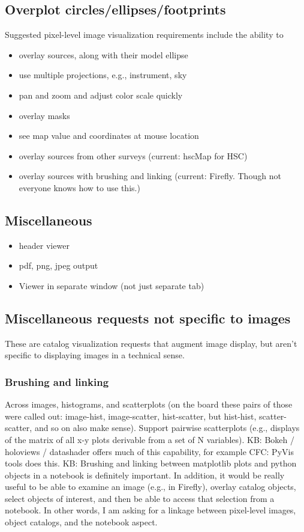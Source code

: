 \subsection{Overplot circles/ellipses/footprints}

Suggested pixel-level image visualization requirements include the ability to
\begin{itemize}
\item{overlay sources, along with their model ellipse}
\item{use multiple projections, e.g., instrument, sky}
\item{pan and zoom and adjust color scale quickly}
\item{overlay masks}
\item{see map value and coordinates at mouse location}
\item{overlay sources from other surveys (current: hscMap for HSC)}
\item{overlay sources with brushing and linking (current: Firefly. Though not everyone knows how to use this.)}
\end{itemize}

\subsection{Miscellaneous}
\begin{itemize}
\item{header viewer}
\item{pdf, png, jpeg output}
\item{Viewer in separate window (not just separate tab)}
\end{itemize}

\subsection{Miscellaneous requests not specific to images}
These are catalog visualization requests that augment image display, but aren't specific to displaying images in a technical sense.

\subsubsection{Brushing and linking}

Across images, histograms, and scatterplots (on the board these pairs of those were called out: image-hist, image-scatter, hist-scatter, but hist-hist, scatter-scatter, and so on also make sense). Support pairwise scatterplots (e.g., displays of the matrix of all x-y plots derivable from a set of N variables).
KB: Bokeh / holoviews / datashader offers much of this capability, for example
CFC: PyVis tools does this.
KB: Brushing and linking between matplotlib plots and python objects in a notebook is definitely important. In addition, it would be really useful to be able to examine an image (e.g., in Firefly), overlay catalog objects, select objects of interest, and then be able to access that selection from a notebook. In other words, I am asking for a linkage between pixel-level images, object catalogs, and the notebook aspect.

